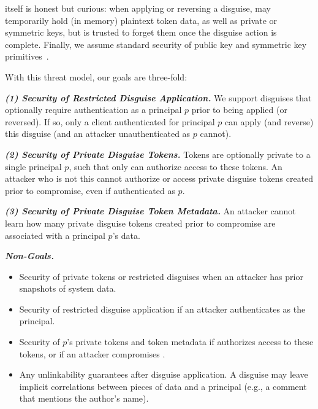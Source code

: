 \sys itself is honest but curious: when applying or reversing a disguise, \sys may temporarily
hold (in memory) plaintext token data, as well as private or symmetric keys, but is trusted to
forget them once the disguise action is complete. 
Finally, we assume standard security of public key and symmetric key primitives~.

With this threat model, our goals are three-fold: 

\vspace{6pt}\noindent\textbf{\emph{(1) Security of Restricted Disguise Application.}}
We support disguises that optionally require authentication as a principal $p$ prior to being
applied (or reversed). If so, only a client authenticated for principal $p$ can apply (and reverse) this disguise (and an
attacker unauthenticated as $p$ cannot).

\vspace{6pt}\noindent\textbf{\emph{(2) Security of Private Disguise Tokens.} }
Tokens are optionally private to a single principal $p$, such that only  can authorize
access to these tokens. An attacker who is not this  cannot
authorize or access private disguise tokens created prior to compromise, even if authenticated as $p$.

\vspace{6pt}\noindent\textbf{\emph{(3) Security of Private Disguise Token Metadata.}}
An attacker cannot learn how many private disguise tokens created prior to compromise are associated with a principal $p$'s data.

\vspace{6pt}\noindent\textbf{\emph{Non-Goals.}}
\begin{itemize}
    \item Security of private tokens or restricted disguises when an attacker has prior snapshots of system data.
    \item Security of restricted disguise application if an attacker authenticates as the principal.
    \item Security of $p$'s private tokens and token metadata if  authorizes access to these
        tokens, or if an attacker compromises .
    \item Any unlinkability guarantees after disguise application. A disguise may leave implicit
        correlations between pieces of data and a principal (e.g., a comment that mentions the author’s name).
\end{itemize}

